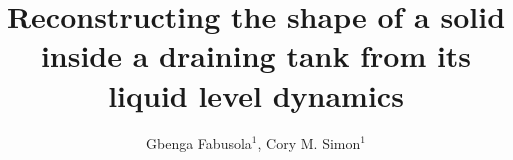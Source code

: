\documentclass[openacc]{rsproca_new}%
\begin{document}
\title{Reconstructing the shape of a solid inside a draining tank from its liquid level dynamics}


\author{%
Gbenga Fabusola$^{1}$, 
Cory M. Simon$^{1}$
}

\address{$^{1}$School of Chemical, Biological, and Environmental Engineering. Oregon State University. Corvallis, OR, USA.
}

\subject{applied mathematics, chemical engineering}


\end{document}
